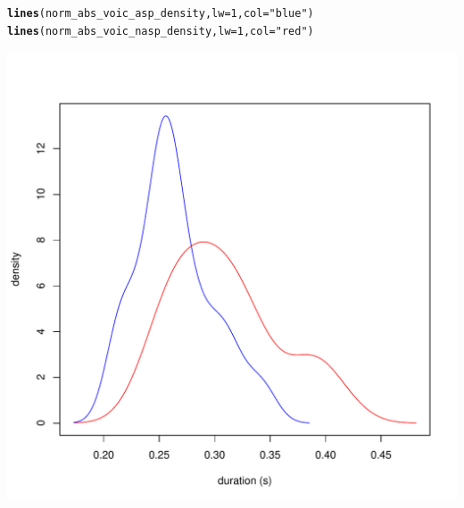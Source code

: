 \documentclass[a4paper,11pt]{article}\usepackage[]{graphicx}\usepackage[]{color}
\makeatletter
\def\maxwidth{ %
  \ifdim\Gin@nat@width>\linewidth
    \linewidth
  \else
    \Gin@nat@width
  \fi
}
\newcommand{\hlnum}[1]{\textcolor[rgb]{0.686,0.059,0.569}{#1}}%
\newcommand{\hlstr}[1]{\textcolor[rgb]{0.192,0.494,0.8}{#1}}%
\newcommand{\hlstd}[1]{\textcolor[rgb]{0.345,0.345,0.345}{#1}}%
\newcommand{\hlkwc}[1]{\textcolor[rgb]{0.333,0.667,0.333}{#1}}%
\newcommand{\hlkwd}[1]{\textcolor[rgb]{0.737,0.353,0.396}{\textbf{#1}}}%
\newenvironment{kframe}{%
 \def\at@end@of@kframe{}%
 \ifinner\ifhmode%
  \def\at@end@of@kframe{\end{minipage}}%
  \begin{minipage}{\columnwidth}%
 \fi\fi%
 \def\FrameCommand##1{\hskip\@totalleftmargin \hskip-\fboxsep
 \colorbox{shadecolor}{##1}\hskip-\fboxsep
     \hskip-\linewidth \hskip-\@totalleftmargin \hskip\columnwidth}%
 \MakeFramed {\advance\hsize-\width
   \@totalleftmargin\z@ \linewidth\hsize
   \@setminipage}}%
 {\par\unskip\endMakeFramed%
 \at@end@of@kframe}
\newenvironment{knitrout}{}{} %
\makeatother
\begin{document}
\begin{knitrout}
\begin{kframe}
\begin{alltt}
\hlkwd{lines}\hlstd{(norm_abs_voic_asp_density,} \hlkwc{lw} \hlstd{=} \hlnum{1}\hlstd{,} \hlkwc{col} \hlstd{=} \hlstr{"blue"}\hlstd{)}
\hlkwd{lines}\hlstd{(norm_abs_voic_nasp_density,} \hlkwc{lw} \hlstd{=} \hlnum{1}\hlstd{,} \hlkwc{col} \hlstd{=} \hlstr{"red"}\hlstd{)}
\end{alltt}
\end{kframe}
\includegraphics[width=\maxwidth]{img/mono-nas-dens-1} 

\end{knitrout}
\end{document}
